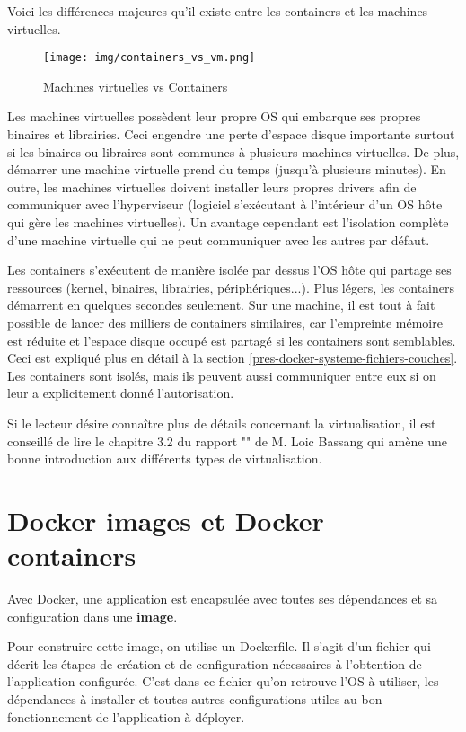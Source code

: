 Voici les différences majeures qu'il existe entre les containers et les machines virtuelles\cite{what_is_docker}.

\begin{figure}[hbtp]
\centering
\texttt{[image: img/containers\_vs\_vm.png]}
\caption{Machines virtuelles vs Containers}
\end{figure}

Les machines virtuelles possèdent leur propre OS qui embarque ses propres binaires et librairies. Ceci engendre une perte d'espace disque importante surtout si les binaires ou libraires sont communes à plusieurs machines virtuelles. De plus, démarrer une machine virtuelle prend du temps (jusqu'à plusieurs minutes). En outre, les machines virtuelles doivent installer leurs propres drivers afin de communiquer avec l'hyperviseur (logiciel s'exécutant à l'intérieur d'un OS hôte qui gère les machines virtuelles). Un avantage cependant est l'isolation complète d'une machine virtuelle qui ne peut communiquer avec les autres par défaut.

Les containers s'exécutent de manière isolée par dessus l'OS hôte qui partage ses ressources (kernel, binaires, librairies, périphériques...). Plus légers, les containers démarrent en quelques secondes seulement. Sur une machine, il est tout à fait possible de lancer des milliers de containers similaires, car l'empreinte mémoire est réduite et l'espace disque occupé est partagé si les containers sont semblables. Ceci est expliqué plus en détail à la section \ref{pres-docker-systeme-fichiers-couches}. Les containers sont isolés, mais ils peuvent aussi communiquer entre eux si on leur a explicitement donné l'autorisation.

Si le lecteur désire connaître plus de détails concernant la virtualisation, il est conseillé de lire le chapitre 3.2 du rapport "\bassangPrjSemestre" de M. Loic Bassang \cite{bassang_semestre} qui amène une bonne introduction aux différents types de virtualisation.


\section{Docker images et Docker containers}
Avec Docker, une application est encapsulée avec toutes ses dépendances et sa configuration dans une \textbf{image}. 

Pour construire cette image, on utilise un Dockerfile. Il s'agit d'un fichier qui décrit les étapes de création et de configuration nécessaires à l'obtention de l'application configurée. C'est dans ce fichier qu'on retrouve l'OS à utiliser, les dépendances à installer et toutes autres configurations utiles au bon fonctionnement de l'application à déployer. 

